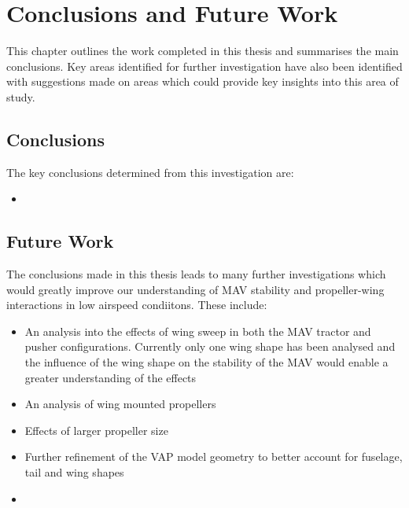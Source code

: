 \graphicspath{{./Figs/}}

\chapter{Conclusions and Future Work} 
This chapter outlines the work completed in this thesis and summarises the main conclusions. Key areas identified for further investigation have also been identified with suggestions made on areas which could provide key insights into this area of study. 
\section{Conclusions}


The key conclusions determined from this investigation are:

\begin{itemize}
    \item 
\end{itemize}


\section{Future Work}
The conclusions made in this thesis leads to many further investigations which would greatly improve our understanding of \acrshort{MAV} stability and propeller-wing interactions in low airspeed condiitons. These include:

\begin{itemize}
    \item An analysis into the effects of wing sweep in both the \acrshort{MAV} tractor and pusher configurations. Currently only one wing shape has been analysed and the influence of the wing shape on the stability of the MAV would enable a greater understanding of the effects 

    \item An analysis of wing mounted propellers

    \item Effects of larger propeller size

    \item Further refinement of the VAP model geometry to better account for fuselage, tail and wing shapes

    \item 

    
\end{itemize}